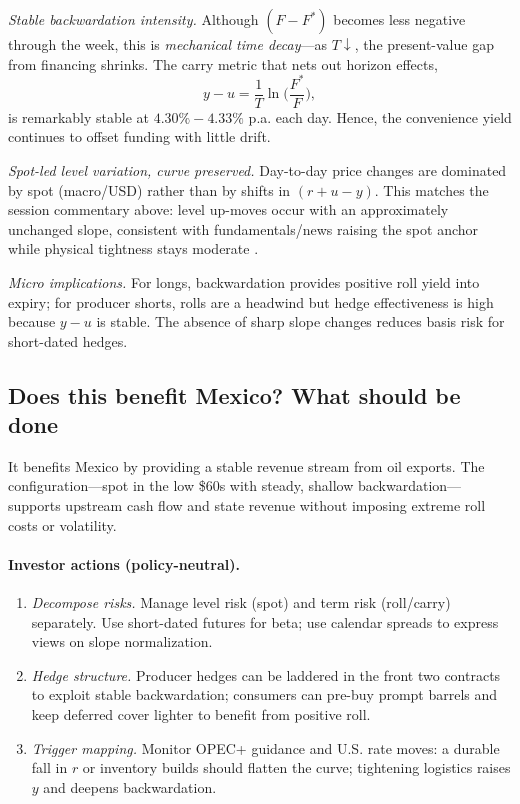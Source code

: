 \documentclass[11pt,a4paper]{article} %
\begin{document}
\textit{Stable backwardation intensity.} Although \((F-F^{*})\) becomes less negative through the week, this is \emph{mechanical time decay}—as \(T\downarrow\), the present-value gap from financing shrinks. The carry metric that nets out horizon effects,
\[
y-u=\frac{1}{T}\ln\!\Big(\frac{F^{*}}{F}\Big),
\]
is remarkably stable at \({4.30\%{-}4.33\%}\) p.a. each day. Hence, the convenience yield continues to offset funding with little drift.

\textit{Spot-led level variation, curve preserved.} Day-to-day price changes are dominated by spot (macro/USD) rather than by shifts in \((r+u-y)\). This matches the session commentary above: level up-moves occur with an approximately unchanged slope, consistent with fundamentals/news raising the spot anchor while physical tightness stays moderate \citep{eia_prices_2023,eia_opec_2024,bis_usd_commodity_2023}.

\textit{Micro implications.} For longs, backwardation provides positive roll yield into expiry; for producer shorts, rolls are a headwind but hedge effectiveness is high because \(y-u\) is stable. The absence of sharp slope changes reduces basis risk for short-dated hedges.

\subsection{Does this benefit Mexico? What should be done}
It benefits Mexico by providing a stable revenue stream from oil exports. The configuration—spot in the low \$60s with steady, shallow backwardation—supports upstream cash flow and state revenue without imposing extreme roll costs or volatility.

\paragraph{Investor actions (policy-neutral).}
\begin{enumerate}
  \item \emph{Decompose risks.} Manage level risk (spot) and term risk (roll/carry) separately. Use short-dated futures for beta; use calendar spreads to express views on slope normalization.
  \item \emph{Hedge structure.} Producer hedges can be laddered in the front two contracts to exploit stable backwardation; consumers can pre-buy prompt barrels and keep deferred cover lighter to benefit from positive roll.
  \item \emph{Trigger mapping.} Monitor OPEC+ guidance and U.S. rate moves: a durable fall in \(r\) or inventory builds should flatten the curve; tightening logistics raises \(y\) and deepens backwardation.
\end{enumerate}
\end{document}
